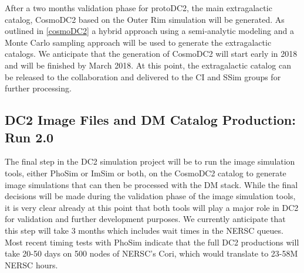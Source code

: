 \documentclass[preprint,times]{aastex61}
\begin{document}
After a two months validation phase for protoDC2, the main extragalactic catalog, CosmoDC2 based on the Outer Rim simulation will be generated. As outlined in \autoref{cosmoDC2} a hybrid approach using a semi-analytic modeling and a Monte Carlo sampling approach will be used to generate the extragalactic catalogs. We anticipate that the generation of CosmoDC2 will start early in 2018 and will be finished by March 2018. At this point, the extragalactic catalog can be released to the collaboration and delivered to the CI and SSim groups for further processing.

\subsection{DC2 Image Files and DM Catalog Production: Run 2.0}

The final step in the DC2 simulation project will be to run the image simulation tools, either PhoSim or ImSim or both, on the CosmoDC2 catalog to generate image simulations that can then be processed with the DM stack. While the final decisions will be made during the validation phase of the image simulation tools, it is very clear already at this point that both tools will play a major role in DC2 for validation and further development purposes. We currently anticipate that this step will take 3 months which includes wait times in the NERSC queues. Most recent timing tests with PhoSim indicate that the full DC2 productions will take 20-50 days on 500 nodes of NERSC's Cori, which would translate to 23-58M NERSC hours. \medskip



\end{document}
